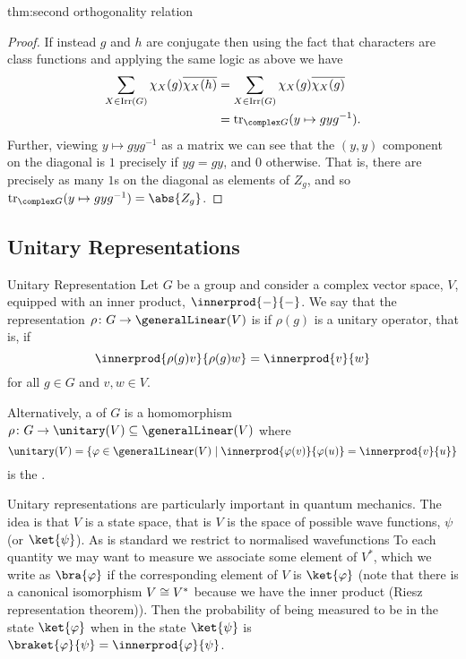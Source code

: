 \begin{thm}{}{thm:second orthogonality relation}
\begin{proof}
        If instead \(g\) and \(h\) are conjugate then using the fact that characters are class functions and applying the same logic as above we have
        \begin{align}
            \sum_{X \in \Irr(G)} \chi_X(g) \overline{\chi_X(h)} &= \sum_{X \in \Irr(G)} \chi_X(g) \overline{\chi_X(g)}\\
            &= \tr_{\complex G}(y \mapsto gyg^{-1}).
        \end{align}
        Further, viewing \(y \mapsto gyg^{-1}\) as a matrix we can see that the \((y, y)\) component on the diagonal is \(1\) precisely if \(yg = gy\), and \(0\) otherwise.
        That is, there are precisely as many \(1\)s on the diagonal as elements of \(Z_g\), and so \(\tr_{\complex G}(y \mapsto gyg^{-1}) = \abs{Z_g}\).
    \end{proof}
\end{thm}

\subsection{Unitary Representations}
\begin{dfn}{Unitary Representation}{}
    Let \(G\) be a group and consider a complex vector space, \(V\), equipped with an inner product, \(\innerprod{-}{-}\).
    We say that the representation \(\rho \colon G \to \generalLinear(V)\) is  if \(\rho(g)\) is a unitary operator, that is, if
    \begin{equation}
        \innerprod{\rho(g)v}{\rho(g)w} = \innerprod{v}{w}
    \end{equation}
    for all \(g \in G\) and \(v, w \in V\).
    
    Alternatively, a  of \(G\) is a homomorphism \(\rho \colon G \to \unitary(V) \subseteq \generalLinear(V)\) where
    \begin{equation}
        \unitary(V) = \{\varphi \in \generalLinear(V) \mid \innerprod{\varphi(v)}{\varphi(u)} = \innerprod{v}{u}\}
    \end{equation}
    is the .
\end{dfn}

Unitary representations are particularly important in quantum mechanics.
The idea is that \(V\) is a state space, that is \(V\) is the space of possible wave functions, \(\psi\) (or \(\ket{\psi}\)).
As is standard we restrict to normalised wavefunctions
To each quantity we may want to measure we associate some element of \(V^*\), which we write as \(\bra{\varphi}\) if the corresponding element of \(V\) is \(\ket{\varphi}\) (note that there is a canonical isomorphism \(V \cong V^*\) because we have the inner product (Riesz representation theorem)).
Then the probability of being measured to be in the state \(\ket{\varphi}\) when in the state \(\ket{\psi}\) is \(\braket{\varphi}{\psi} = \innerprod{\varphi}{\psi}\).

